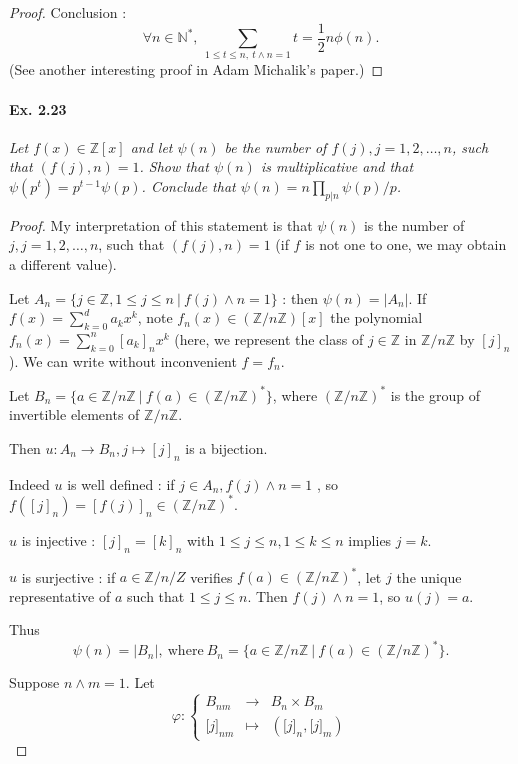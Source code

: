 \documentclass[11pt,a4paper]{article}
\newcommand{\Z}{\mathbb{Z}}
\newcommand{\N}{\mathbb{N}}
\begin{document}
{\begin{proof}
Conclusion : 
$$\forall n \in \N^*, \ \sum_{1\leq t \leq  n, \ t\wedge n =1} t = \frac{1}{2} n \phi(n).$$
(See another interesting proof in Adam Michalik's paper.)

\end{proof}


\paragraph{Ex. 2.23}

{\it Let $f(x) \in \Z[x]$ and let $\psi(n)$ be the number of $f(j), j = 1,2, \ldots, n$, such that $(f(j), n) = 1$. Show that $\psi(n)$ is multiplicative and that $\psi(p^t) = p^{t-1} \psi(p)$. Conclude that $\psi(n) = n \prod_{p|n} \psi(p)/p$.
}

\begin{proof}
My interpretation of this statement is that $\psi(n)$ is the number of $j, j=1,2, \ldots, n$, such that $(f(j), n) = 1$ (if $f$ is not one to one, we may obtain a different value).

Let $A_n = \{j \in \Z , 1\leq j \leq n \ \vert  \ f(j) \wedge n = 1\}$ : then $\psi(n) = \vert A_n \vert$.
If $f(x) = \sum_{k=0}^d a_k x^k$, note $f_n(x) \in (\Z/n\Z)[x]$ the polynomial $f_n(x) = \sum_{k=0}^n [a_k]_n x^k$ (here, we represent the class of $j \in \Z$ in $\Z/n\Z$ by $[j]_n$ ).
We can write without inconvenient $f=f_n$.

Let $B_n = \{a \in \Z/n\Z \ \vert \ f(a) \in (\Z/n\Z)^*\}$, where $(\Z/n\Z)^*$ is the group of invertible elements of $\Z/n\Z$. 

Then $u : A_n \to B_n, j \mapsto [j]_n$ is a bijection. 

Indeed $u$ is well defined : if $j \in A_n, f(j) \wedge n = 1$ , so $f([j]_n) = [f(j)]_n \in (\Z/n\Z)^*$. 

$u$ is injective : $[j]_n = [k]_n$ with $ 1 \leq j \leq n, 1\leq k \leq n$ implies $j=k$.

$u$ is surjective : if $a \in \Z/n/Z$ verifies $f(a) \in (\Z/n\Z)^*$, let $j$ the unique representative of $a$ such that $1\leq j \leq n$. Then $f(j) \wedge n =1$, so $u(j) = a$.

Thus $$\psi(n) = \vert B_n \vert,\ \mathrm{where} \ B_n = \{a \in \Z/n\Z \ \vert \ f(a) \in (\Z/n\Z)^*\}.$$

Suppose $n\wedge m = 1$. Let 
$$
\varphi : 
\left\{
\begin{array}{ccc}
  B_{nm}& \to   & B_n\times B_m  \\
  {[}j{]}_{nm}& \mapsto  & ({[}j{]}_{n},{[}j{]}_{m})
\end{array}
\right.
$$


\end{proof}}
\end{document}
